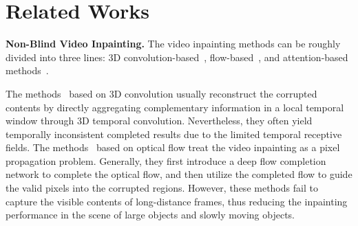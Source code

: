 \section{Related Works}
\label{Related Work}

\noindent\textbf{Non-Blind Video Inpainting.}
The video inpainting methods can be roughly divided into three lines: 3D convolution-based~\cite{chang2019free,Kim_2019_CVPR,9558783}, flow-based~\cite{Gao-ECCV-FGVC,Kang2022ErrorCF,Ke2021OcclusionAwareVO,li2022towards,xu2019deep,Zhang_2022_CVPR,zou2020progressive}, and attention-based methods~\cite{cai2022devit,lee2019cpnet,Li2020ShortTermAL,liu2021fuseformer,Ren_2022_CVPR,9010390,srinivasan2021spatial,yan2020sttn,zhang2022flow}. 

The methods~\cite{chang2019free,Kim_2019_CVPR,9558783} based on 3D convolution usually reconstruct the corrupted contents by directly aggregating complementary information in a local temporal window through 3D temporal convolution. 
Nevertheless, they often yield temporally inconsistent completed results due to the limited temporal receptive fields.
The methods~\cite{Gao-ECCV-FGVC,Kang2022ErrorCF,Ke2021OcclusionAwareVO,li2022towards,xu2019deep,Zhang_2022_CVPR,zou2020progressive} based on optical flow treat the video inpainting as a pixel propagation problem. 
Generally, they first introduce a deep flow completion network to complete the optical flow, and then utilize the completed flow to guide the valid pixels into the corrupted regions. 
However, these methods fail to capture the visible contents of long-distance frames, thus reducing the inpainting performance in the scene of large objects and slowly moving objects. 


